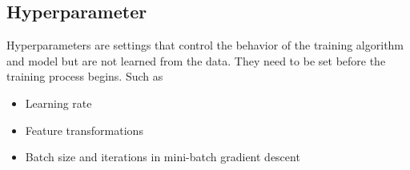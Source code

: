 \documentclass[twocolumn, 10pt]{article}
\begin{document}
\subsection*{Hyperparameter}
Hyperparameters are settings that control the behavior of the training algorithm and model but are not learned from the data. They need to be set before the training process begins. Such as 
\begin{itemize}
    \item Learning rate
    \item Feature transformations
    \item Batch size and iterations in mini-batch gradient descent
\end{itemize}
\end{document}
